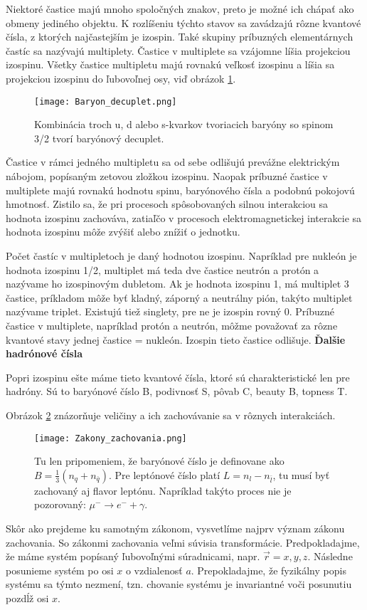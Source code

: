 \documentclass[../../main.tex]{subfiles}
\begin{document}
Niektoré častice majú mnoho spoločných znakov, preto je možné ich chápať ako obmeny jediného objektu. K rozlíšeniu týchto stavov sa zavádzajú rôzne kvantové čísla, z ktorých najčastejším je izospin. Také skupiny príbuzných elementárnych častíc sa nazývajú multiplety. Častice v multiplete sa vzájomne líšia projekciou izospinu. Všetky častice multipletu majú rovnakú veľkosť izospinu a líšia sa projekciou izospinu do ľubovoľnej osy, viď obrázok \ref{sf1:fig:Baryon_decuplet}.\par
\begin{figure}[!h]
\centering
\texttt{[image: Baryon\_decuplet.png]}
\caption{Kombinácia troch u, d alebo s-kvarkov tvoriacich baryóny so spinom 3/2 tvorí baryónový decuplet.}
\label{sf1:fig:Baryon_decuplet}
\end{figure}
Častice v rámci jedného multipletu sa od sebe odlišujú prevážne elektrickým nábojom, popísaným zetovou zložkou izospinu. Naopak príbuzné častice v multiplete majú rovnakú hodnotu spinu, baryónového čísla a podobnú pokojovú hmotnosť. Zistilo sa, že pri procesoch spôsobovaných silnou interakciou sa hodnota izospinu zachováva, zatiaľčo v procesoch elektromagnetickej interakcie sa hodnota izospinu môže zvýšiť alebo znížiť o jednotku.

Počet častíc v multipletoch je daný hodnotou izospinu. Napríklad pre nukleón je hodnota izospinu 1/2, multiplet má teda dve častice neutrón a protón a nazývame ho izospinovým dubletom. Ak je hodnota izospinu 1, má multiplet 3 častice, príkladom môže byť kladný, záporný a neutrálny pión, takýto multiplet nazývame triplet. Existujú tiež singlety, pre ne je izospin rovný 0. Príbuzné častice v multiplete, napríklad protón a neutrón, môžme považovať za rôzne kvantové stavy jednej častice = nukleón. Izospin tieto častice odlišuje.\newline
\textbf{Ďalšie hadrónové čísla}\par
Popri izospinu ešte máme tieto kvantové čísla, ktoré sú charakteristické len pre hadróny. Sú to baryónové číslo B, podivnosť S, pôvab C, beauty B, topness T. 

Obrázok \ref{sf1:fig:zzachovania} znázorňuje veličiny a ich zachovávanie sa v rôznych interakciách. 
\begin{figure}[!h]
\centering
\texttt{[image: Zakony\_zachovania.png]}
\caption{Tu len pripomeniem, že baryónové číslo je definovane ako $B=\frac{1}{3}(n_q+n_{\bar{q}})$. Pre leptónové číslo platí $L=n_l-n_{\bar{l}}$, tu musí byť zachovaný aj flavor leptónu. Napríklad takýto proces nie je pozorovaný: $\mu^- \rightarrow e^-+\gamma$.}
\label{sf1:fig:zzachovania}
\end{figure}
\newline
Skôr ako prejdeme ku samotným zákonom, vysvetlíme najprv význam zákonu zachovania. So zákonmi zachovania veľmi súvisia transformácie. Predpokladajme, že máme systém popísaný ľubovoľnými súradnicami, napr. $\vec{r}=x,y,z.$ Následne posunieme systém po osi $x$ o vzdialenosť $a$. Prepokladajme, že fyzikálny popis systému sa týmto nezmení, tzn. chovanie systému je invariantné voči posunutiu pozdĺž osi $x$.
\end{document}
